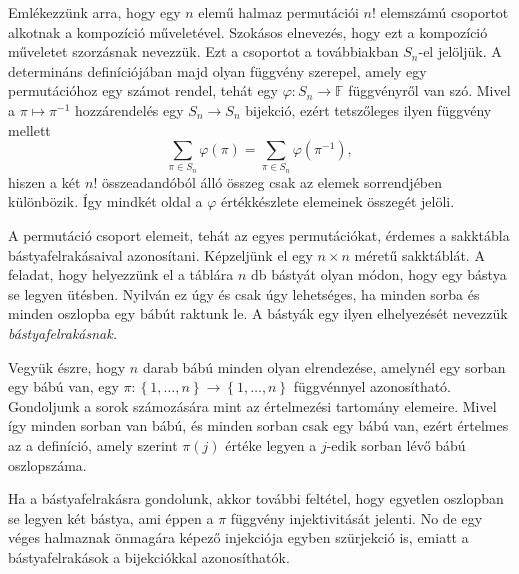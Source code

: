 \documentclass[9pt, a4paper, showtrims]{memoir}
\theoremstyle{plain}
\theoremstyle{remark}
\theoremstyle{definition}
\begin{document}
Emlékezzünk arra,
hogy egy $n$ elemű halmaz permutációi $n!$ elemszámú csoportot alkotnak a kompozíció műveletével. 
Szokásos elnevezés, hogy ezt a kompozíció műveletet szorzásnak nevezzük.
Ezt a csoportot a továbbiakban $S_{n}$-el jelöljük.
A determináns definíciójában majd olyan függvény szerepel, 
amely egy permutációhoz egy számot rendel, 
tehát egy $\varphi:S_n\to\mathbb{F}$ függvényről van szó.
Mivel a $\pi\mapsto \pi^{-1}$ hozzárendelés egy $S_n\to S_n$ bijekció,
ezért tetszőleges ilyen függvény mellett
\[
    \sum_{\pi\in S_n}\varphi\left( \pi \right)=
    \sum_{\pi\in S_n}\varphi\left( \pi^{-1} \right),
\]
hiszen a két $n!$ összeadandóból álló összeg csak az elemek sorrendjében különbözik. 
Így mindkét oldal a $\varphi$ értékkészlete elemeinek összegét jelöli.

A permutáció csoport elemeit, 
tehát az egyes permutációkat,
érdemes a sakktábla bástyafelrakásaival azonosítani.
Képzeljünk el egy $n\times n$ méretű sakktáblát. 
A feladat, hogy helyezzünk el a táblára $n$ db bástyát olyan módon, 
hogy egy bástya se legyen ütésben.
Nyilván ez úgy és csak úgy lehetséges, 
ha minden sorba és minden oszlopba egy bábút raktunk le. 
A bástyák egy ilyen elhelyezését nevezzük \emph{bástyafelrakásnak.}

Vegyük észre, hogy $n$ darab bábú minden olyan elrendezése, 
amelynél egy sorban egy bábú van, egy 
\begin{math}
    \pi:\left\{ 1,\dots,n \right\} \to \left\{ 1,\dots,n \right\}
\end{math}
függvénnyel azonosítható. 
Gondoljunk a sorok számozására mint az értelmezési tartomány elemeire.
Mivel így minden sorban van bábú, 
és minden sorban csak egy bábú van,
ezért értelmes az a definíció,
amely szerint  $\pi\left( j \right)$ értéke legyen a $j$-edik sorban lévő bábú oszlopszáma.

Ha a bástyafelrakásra gondolunk,
akkor további feltétel, 
hogy egyetlen oszlopban se legyen két bástya, 
ami éppen a $\pi$ függvény injektivitását jelenti. 
No de egy véges halmaznak önmagára képező injekciója egyben szürjekció is, 
emiatt a bástyafelrakások a bijekciókkal azonosíthatók.
\end{document}
